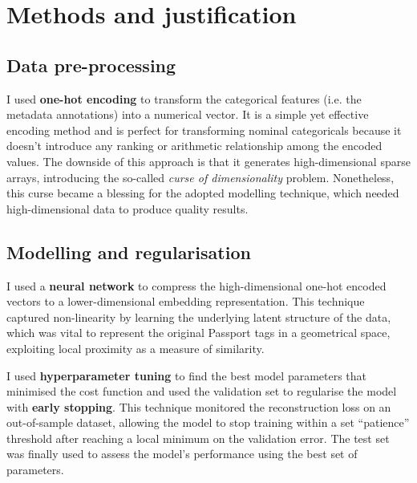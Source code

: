 
\section{Methods and justification}

\subsection{Data pre-processing}

I used \textbf{one-hot encoding} to transform the categorical features (i.e. the metadata annotations) into a numerical vector.
It is a simple yet effective encoding method and is perfect for transforming nominal categoricals because it doesn’t introduce
any ranking or arithmetic relationship among the encoded values.
The downside of this approach is that it generates high-dimensional sparse arrays,
introducing the so-called \textit{curse of dimensionality} problem.
Nonetheless, this curse became a blessing for the adopted modelling technique,
which needed high-dimensional data to produce quality results.

\subsection{Modelling and regularisation}

I used a \textbf{neural network} to compress the high-dimensional one-hot encoded vectors to a lower-dimensional embedding representation.
This technique captured non-linearity by learning the underlying latent structure of the data, which was vital to represent the original
Passport tags in a geometrical space, exploiting local proximity as a measure of similarity.

I used \textbf{hyperparameter tuning} to find the best model parameters
that minimised the cost function and used the validation set to regularise the model with \textbf{early stopping}.
This technique monitored the reconstruction loss on an out-of-sample dataset,
allowing the model to stop training within a set ``patience'' threshold after reaching a local minimum on the validation error.
The test set was finally used to assess the model's performance using the best set of parameters.

